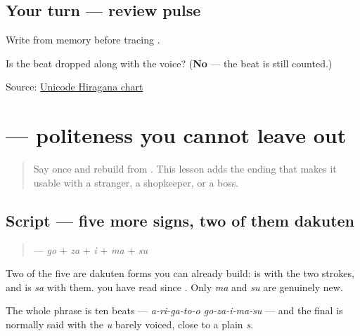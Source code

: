 \subsection*{Your turn — review pulse}
Write \textbf{} from memory before tracing \textbf{}.

\begin{tcolorbox}[breakable,colback=teal!4,colframe=teal!35!black,title={Before you move on}]
Is the beat dropped along with the voice? (\textbf{No} — the beat is still counted.)

Source: \href{https://www.unicode.org/charts/PDF/U3040.pdf}{Unicode Hiragana chart}
\end{tcolorbox}
\section[\texorpdfstring{\ja{ありがとうございます} (arigatō gozaimasu)}{ありがとうございます (arigatō gozaimasu)}]{ — politeness you cannot leave out}

\label{lesson:JA-C01-gozaimasu}



\begin{quote}
Say \textbf{} once and rebuild \textbf{} from \textbf{}. This lesson adds the ending that makes it usable with a stranger, a shopkeeper, or a boss.
\end{quote}

\subsection*{Script — five more signs, two of them dakuten}
\begin{quote}
\textbf{} — \textbf{} \emph{go} + \textbf{} \emph{za} + \textbf{} \emph{i} + \textbf{} \emph{ma} + \textbf{} \emph{su}
\end{quote}

Two of the five are dakuten forms you can already build: \textbf{} is \textbf{} with the two strokes, and \textbf{} is \textbf{} \emph{sa} with them. \textbf{} you have read since \textbf{}. Only \textbf{} \emph{ma} and \textbf{} \emph{su} are genuinely new.

The whole phrase is ten beats — \emph{a-ri-ga-to-o go-za-i-ma-su} — and the final \textbf{} is normally said with the \emph{u} barely voiced, close to a plain \emph{s}.

